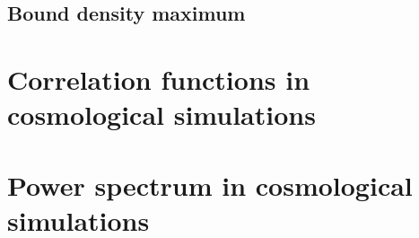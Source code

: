 \subsection{ Bound density maximum }



\section{ Correlation functions in cosmological simulations }



\section{ Power spectrum in cosmological simulations }

